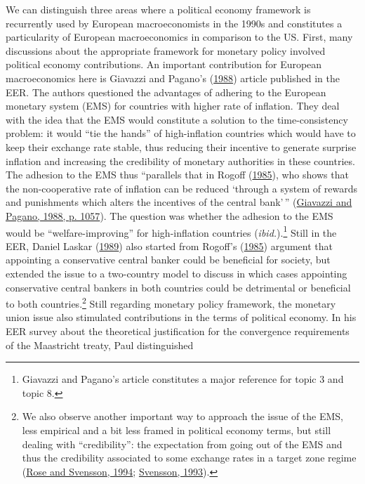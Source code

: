 \documentclass[
  12pt,
  onecolumn]{article}
\begin{document}
We can distinguish three areas where a political economy framework is
recurrently used by European macroeconomists in the 1990s and
constitutes a particularity of European macroeconomics in comparison to
the US. First, many discussions about the appropriate framework for
monetary policy involved political economy contributions. An important
contribution for European macroeconomics here is Giavazzi and Pagano's
(\protect\hyperlink{ref-giavazzi1988}{1988}) article published in the
EER. The authors questioned the advantages of adhering to the European
monetary system (EMS) for countries with higher rate of inflation. They
deal with the idea that the EMS would constitute a solution to the
time-consistency problem: it would ``tie the hands'' of high-inflation
countries which would have to keep their exchange rate stable, thus
reducing their incentive to generate surprise inflation and increasing
the credibility of monetary authorities in these countries. The adhesion
to the EMS thus ``parallels that in Rogoff
(\protect\hyperlink{ref-rogoff1985b}{1985}), who shows that the
non-cooperative rate of inflation can be reduced `through a system of
rewards and punishments which alters the incentives of the central
bank'\,'' (\protect\hyperlink{ref-giavazzi1988}{Giavazzi and Pagano,
1988, p. 1057}). The question was whether the adhesion to the EMS would
be ``welfare-improving'' for high-inflation countries
(\emph{ibid.}).\footnote{Giavazzi and Pagano's article constitutes a
  major reference for topic 3 and topic 8.} Still in the EER, Daniel
Laskar (\protect\hyperlink{ref-laskar1989}{1989}) also started from
Rogoff's (\protect\hyperlink{ref-rogoff1985b}{1985}) argument that
appointing a conservative central banker could be beneficial for
society, but extended the issue to a two-country model to discuss in
which cases appointing conservative central bankers in both countries
could be detrimental or beneficial to both countries.\footnote{We also
  observe another important way to approach the issue of the EMS, less
  empirical and a bit less framed in political economy terms, but still
  dealing with ``credibility'': the expectation from going out of the
  EMS and thus the credibility associated to some exchange rates in a
  target zone regime (\protect\hyperlink{ref-rose1994}{Rose and
  Svensson, 1994}; \protect\hyperlink{ref-svensson1993a}{Svensson,
  1993}).} Still regarding monetary policy framework, the monetary union
issue also stimulated contributions in the terms of political economy.
In his EER survey about the theoretical justification for the
convergence requirements of the Maastricht treaty, Paul distinguished
\end{document}
